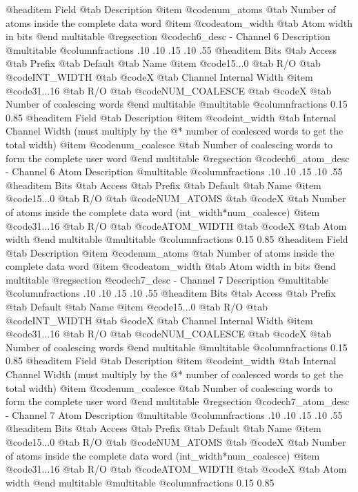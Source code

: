 @headitem Field @tab Description
@item @code{num_atoms} @tab Number of atoms inside the complete data word
@item @code{atom_width} @tab Atom width in bits
@end multitable
@regsection @code{ch6_desc} - Channel 6 Description
@multitable @columnfractions .10 .10 .15 .10 .55
@headitem Bits @tab Access @tab Prefix @tab Default @tab Name
@item @code{15...0}
@tab R/O @tab
@code{INT_WIDTH}
@tab @code{X} @tab 
Channel Internal Width
@item @code{31...16}
@tab R/O @tab
@code{NUM_COALESCE}
@tab @code{X} @tab 
Number of coalescing words
@end multitable
@multitable @columnfractions 0.15 0.85
@headitem Field @tab Description
@item @code{int_width} @tab Internal Channel Width (must multiply by the @* number of coalesced words to get the total width)
@item @code{num_coalesce} @tab Number of coalescing words to form the complete user word
@end multitable
@regsection @code{ch6_atom_desc} - Channel 6 Atom Description
@multitable @columnfractions .10 .10 .15 .10 .55
@headitem Bits @tab Access @tab Prefix @tab Default @tab Name
@item @code{15...0}
@tab R/O @tab
@code{NUM_ATOMS}
@tab @code{X} @tab 
Number of atoms inside the complete data word (int_width*num_coalesce)
@item @code{31...16}
@tab R/O @tab
@code{ATOM_WIDTH}
@tab @code{X} @tab 
Atom width
@end multitable
@multitable @columnfractions 0.15 0.85
@headitem Field @tab Description
@item @code{num_atoms} @tab Number of atoms inside the complete data word
@item @code{atom_width} @tab Atom width in bits
@end multitable
@regsection @code{ch7_desc} - Channel 7 Description
@multitable @columnfractions .10 .10 .15 .10 .55
@headitem Bits @tab Access @tab Prefix @tab Default @tab Name
@item @code{15...0}
@tab R/O @tab
@code{INT_WIDTH}
@tab @code{X} @tab 
Channel Internal Width
@item @code{31...16}
@tab R/O @tab
@code{NUM_COALESCE}
@tab @code{X} @tab 
Number of coalescing words
@end multitable
@multitable @columnfractions 0.15 0.85
@headitem Field @tab Description
@item @code{int_width} @tab Internal Channel Width (must multiply by the @* number of coalesced words to get the total width)
@item @code{num_coalesce} @tab Number of coalescing words to form the complete user word
@end multitable
@regsection @code{ch7_atom_desc} - Channel 7 Atom Description
@multitable @columnfractions .10 .10 .15 .10 .55
@headitem Bits @tab Access @tab Prefix @tab Default @tab Name
@item @code{15...0}
@tab R/O @tab
@code{NUM_ATOMS}
@tab @code{X} @tab 
Number of atoms inside the complete data word (int_width*num_coalesce)
@item @code{31...16}
@tab R/O @tab
@code{ATOM_WIDTH}
@tab @code{X} @tab 
Atom width
@end multitable
@multitable @columnfractions 0.15 0.85
